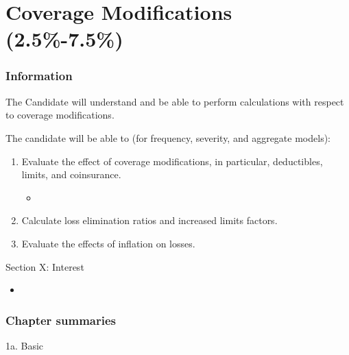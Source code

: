 \chapter[Coverage Modifications]{Coverage Modifications (2.5\%-7.5\%)}

\subsection{Information}

\begin{distributions}[Objective]
The Candidate will understand and be able to perform calculations with respect to coverage modifications.
\end{distributions}

\begin{outcomes}
The candidate will be able to (for frequency, severity, and aggregate models):
\begin{enumerate}[label = \alph*), leftmargin = *]
	\item	Evaluate the effect of coverage modifications, in particular, deductibles, limits, and coinsurance.
		\begin{itemize}[leftmargin = *]
		\item	
		\end{itemize}
	\item	Calculate loss elimination ratios and increased limits factors.
	\item	Evaluate the effects of inflation on losses.
\end{enumerate}
\end{outcomes}

\begin{ASM_chapter}
Section X: Interest 
\begin{itemize}[leftmargin = *]
	\item	{}
\end{itemize}
\end{ASM_chapter}

\subsection{Chapter summaries}

\begin{CHPT_SUMM_AUTO}[label = {L.-1a}]{1a. Basic}

\end{CHPT_SUMM_AUTO}
